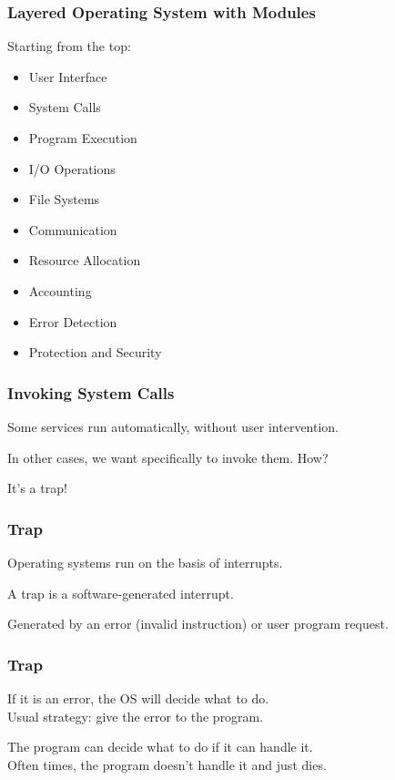 \begin{frame}
\frametitle{Layered Operating System with Modules}

Starting from the top:

\begin{itemize}
	\item User Interface
	\item System Calls
	\item Program Execution
	\item I/O Operations
	\item File Systems
	\item Communication
	\item Resource Allocation
	\item Accounting
	\item Error Detection
	\item Protection and Security
\end{itemize}


\end{frame}

\begin{frame}
\frametitle{Invoking System Calls}

Some services run automatically, without user intervention.

In other cases, we want specifically to invoke them. How?

It's a trap!

\end{frame}

\begin{frame}
\frametitle{Trap}

Operating systems run on the basis of interrupts.

A \alert{trap} is a software-generated interrupt.

Generated by an error (invalid instruction) or user program request.

\end{frame}

\begin{frame}
\frametitle{Trap}

If it is an error, the OS will decide what to do.\\
\quad Usual strategy: give the error to the program.

The program can decide what to do if it can handle it.\\
\quad Often times, the program doesn't handle it and just dies.

\end{frame}

